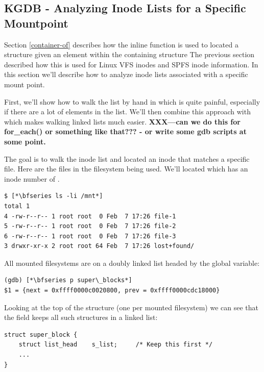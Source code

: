 
\subsection{KGDB - Analyzing Inode Lists for a Specific Mountpoint}\label{kdgb-inodelist}

Section \ref{container-of} describes how the  inline function is used to located a structure given an element within the containing structure The previous section described how this is used for Linux VFS inodes and SPFS inode information. In this section we'll describe how to analyze inode lists associated with a specific mount point.

First, we'll show how to walk the list by hand in  which is quite painful, especially if there are a lot of elements in the list. We'll then combine this approach with  which makes walking linked lists much easier. \textbf{XXX---can we do this for for\_each() or something like that??? - or write some gdb scripts at some point.}

The goal is to walk the inode list and located an inode that matches a specific file. Here are the files in the filesystem being used. We'll located  which has an inode number of .

\begin{lstlisting}
$ [*\bfseries ls -li /mnt*]
total 1
4 -rw-r--r-- 1 root root  0 Feb  7 17:26 file-1
5 -rw-r--r-- 1 root root  0 Feb  7 17:26 file-2
6 -rw-r--r-- 1 root root  0 Feb  7 17:26 file-3
3 drwxr-xr-x 2 root root 64 Feb  7 17:26 lost+found/
\end{lstlisting}

\noindent
All mounted filesystems are on a doubly linked list headed by the  global variable:

\begin{lstlisting}
(gdb) [*\bfseries p super\_blocks*]
$1 = {next = 0xffff0000c0020800, prev = 0xffff0000cdc18000}
\end{lstlisting}

\noindent
Looking at the top of the  structure (one per mounted filesystem) we can see that the  field keeps all such structures in a linked list:

\begin{lstlisting}
struct super_block {
    struct list_head    s_list;     /* Keep this first */
    ...
}
\end{lstlisting}

